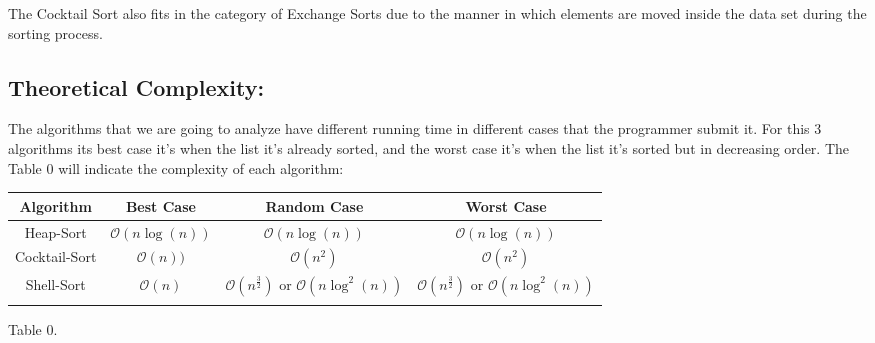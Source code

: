 The Cocktail Sort also fits in the category of Exchange Sorts due to the manner in which elements are moved inside the data set during the sorting process.

\subsection{Theoretical Complexity:}

The algorithms that we are going to analyze have different running time in different cases that the programmer submit it. For this 3 algorithms its best case it's when the list it's already sorted, and the worst case it's when the list it's sorted but in decreasing order. The Table 0 will indicate the complexity of each algorithm: \hfill \break

{\small
\begin{center} 
\begin{tabular}[.5cm]{ c c c c } 
\toprule \toprule
\hspace{20px} Algorithm \hspace{20px} & \hspace{30px} Best Case \hspace{30px} & \hspace{30px} Random Case \hspace{30px} & \hspace{30px} Worst Case \hspace{30px} \\ 
\midrule \midrule
Heap-Sort & $\mathcal{O}(n\log(n))$ & $\mathcal{O}(n\log(n))$ & $\mathcal{O}(n\log(n))$ \\
\cmidrule{1-4}
Cocktail-Sort & $\mathcal{O}(n))$ & $\mathcal{O}(n^{2})$ & $\mathcal{O}(n^{2})$ \\
\cmidrule{1-4}
Shell-Sort & $\mathcal{O}(n)$ & $\mathcal{O}(n^{\frac{3}{2}})$ or $\mathcal{O}(n\log^{2}(n))$ & $\mathcal{O}(n^{\frac{3}{2}})$ or $\mathcal{O}(n\log^{2}(n))$ \\
\bottomrule 
\linebreak 
\end{tabular} 
\linebreak \linebreak Table 0.
\end{center}}


\pagebreak